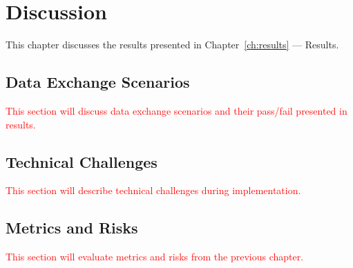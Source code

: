 \chapter{Discussion}\label{ch:discussion}

\begin{chapterabstract}
    This chapter discusses the results presented in Chapter~\ref{ch:results} --- Results.
\end{chapterabstract}

\section{Data Exchange Scenarios}\label{sec:data-exchange-scenarios-evaluation}

\textcolor{red}{This section will discuss data exchange scenarios and their pass/fail presented in results.}

\section{Technical Challenges}\label{sec:technical-challenges}

\textcolor{red}{This section will describe technical challenges during implementation.}

\section{Metrics and Risks}\label{sec:metrics-and-risks-evaluation}

\textcolor{red}{This section will evaluate metrics and risks from the previous chapter.}

